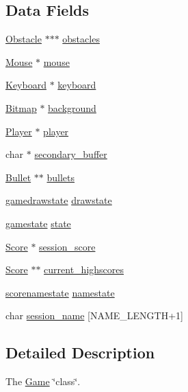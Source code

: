 \subsection*{Data Fields}
\begin{DoxyCompactItemize}
\item 
\hyperlink{struct_obstacle}{Obstacle} $\ast$$\ast$$\ast$ \hyperlink{struct_game_ab4a2d4a1db034550f0e6755c8417f00e}{obstacles}
\item 
\hyperlink{struct_mouse}{Mouse} $\ast$ \hyperlink{struct_game_a2514b83cbae6998a57eae74a24f6faf4}{mouse}
\item 
\hyperlink{struct_keyboard}{Keyboard} $\ast$ \hyperlink{struct_game_a945ceeb6236fbaf00dcdb7a0109f0d40}{keyboard}
\item 
\hyperlink{struct_bitmap}{Bitmap} $\ast$ \hyperlink{struct_game_a15de70574bc710486bf129a5c8f1634e}{background}
\item 
\hyperlink{struct_player}{Player} $\ast$ \hyperlink{struct_game_a96781128d3743da3d17e0fdd91afba7b}{player}
\item 
char $\ast$ \hyperlink{struct_game_a1820f1e9a26c0253b13be1df94052ca1}{secondary\+\_\+buffer}
\item 
\hyperlink{struct_bullet}{Bullet} $\ast$$\ast$ \hyperlink{struct_game_a6a95913dbac873584311bd479b43f911}{bullets}
\item 
\hyperlink{group__game_gab1e4078b5fa77cbf79de5e160f4cb261}{gamedrawstate} \hyperlink{struct_game_ab151fa4f58b0ddc30af7e501f6ba2ec3}{drawstate}
\item 
\hyperlink{group__game_ga33d4db650f69082296cc8c864c785e15}{gamestate} \hyperlink{struct_game_abb14911062a24c4178eb0f62fca2b925}{state}
\item 
\hyperlink{struct_score}{Score} $\ast$ \hyperlink{struct_game_ad7d780df0071261da7a401c839fa8a66}{session\+\_\+score}
\item 
\hyperlink{struct_score}{Score} $\ast$$\ast$ \hyperlink{struct_game_a544b8de55d5dc1667fad656b245d4a5a}{current\+\_\+highscores}
\item 
\hyperlink{group__game_ga74f568c551e9db616e8fae5ed65be48d}{scorenamestate} \hyperlink{struct_game_a49bcb1da4ed10a863fee60550febc40a}{namestate}
\item 
char \hyperlink{struct_game_a744d78025079ffc153f0be03356efdbe}{session\+\_\+name} \mbox{[}N\+A\+M\+E\+\_\+\+L\+E\+N\+G\+TH+1\mbox{]}
\end{DoxyCompactItemize}


\subsection{Detailed Description}
The \hyperlink{struct_game}{Game} \char`\"{}class\char`\"{}. 

